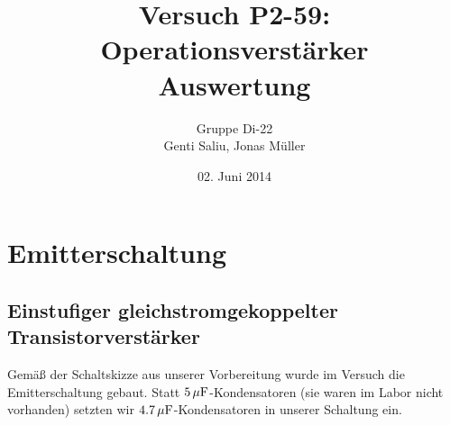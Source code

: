 \documentclass[a4paper,titlepage]{scrartcl}
\title{Versuch P2-59: Operationsverstärker\\Auswertung}
\author{Gruppe Di-22\\Genti Saliu, Jonas Müller}
\date{02. Juni 2014}
\numberwithin{equation}{section}
\begin{document}
\begin{titlepage}
\maketitle
\thispagestyle{empty}
\end{titlepage}

\newpage
{}
\tableofcontents

\newpage
{}

\section{Emitterschaltung}
\subsection{Einstufiger gleichstromgekoppelter Transistorverstärker}
Gemäß der Schaltskizze aus unserer Vorbereitung wurde im Versuch die Emitterschaltung gebaut. Statt $\unit[5]{\mu F}$-Kondensatoren (sie waren im Labor nicht vorhanden) setzten wir $\unit[4.7]{\mu F}$-Kondensatoren in unserer Schaltung ein.
\end{document}
